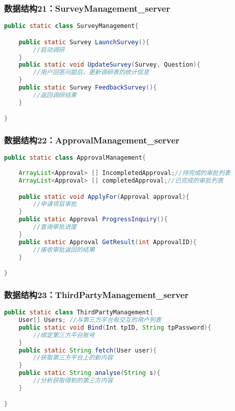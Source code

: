 {\color{red}

\subsubsection{数据结构21：SurveyManagement\_server}
\begin{lstlisting}[language=Java, caption=信息调研管理类]
public static class SurveyManagement{

    public static Survey LaunchSurvey(){
        //启动调研
    }
    public static void UpdateSurvey(Survey, Question){
        //用户回答问题后，更新调研表的统计信息
    }
    public static Survey FeedbackSurvey(){
        //返回调研结果
    }

} 
\end{lstlisting}


\subsubsection{数据结构22：ApprovalManagement\_server}
\begin{lstlisting}[language=Java, caption=审批管理类]
public static class ApprovalManagement{
    
    ArrayList<Approval> [] IncompletedApproval;//待完成的审批列表
    ArrayList<Approval> [] completedApproval;//已完成的审批列表

    public static void ApplyFor(Approval approval){
        //申请项目审批
    }
    public static Approval ProgressInquiry(){
        //查询审批进度
    }
    public static Approval GetResult(int ApprovalID){
        //接收审批返回的结果
    }

} 
\end{lstlisting}

\subsubsection{数据结构23：ThirdPartyManagement\_server}
\begin{lstlisting}[language=Java, caption=第三方账号管理类]
public static class ThirdPartyManagement{
    User[] Users; //与第三方平台有交互的用户列表
    public static void Bind(Int tpID, String tpPassword){
        //绑定第三方平台账号
    }
    public static String fetch(User user){
        //获取第三方平台上的新内容
    }
    public static String analyse(String s){
        //分析获取得到的第三方内容
    }

} 
\end{lstlisting}



}


